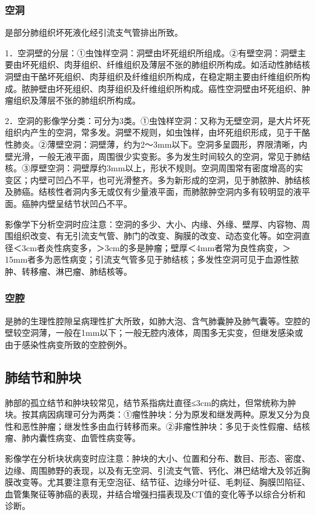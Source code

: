\subsubsection{空洞}

是部分肺组织坏死液化经引流支气管排出所致。

1．空洞壁的分层：①虫蚀样空洞：洞壁由坏死组织所组成。②有壁空洞：洞壁主要由坏死组织、肉芽组织、纤维组织及薄层不张的肺组织所构成。如活动性肺结核洞壁由干酪坏死组织、肉芽组织及纤维组织所构成，在稳定期主要由纤维组织所构成。脓肿壁由坏死组织、肉芽组织及纤维组织所构成。癌性空洞壁由坏死组织、肿瘤组织及薄层不张的肺组织所构成。

2．空洞的影像学分类：可分为3类。①虫蚀样空洞：又称为无壁空洞，是大片坏死组织内产生的空洞，常多发。洞壁不规则，如虫蚀样，由坏死组织形成，见于干酪性肺炎。②薄壁空洞：洞壁薄，约为2～3mm以下。空洞多呈圆形，界限清晰，内壁光滑，一般无液平面，周围很少实变影。多为发生时间较久的空洞，常见于肺结核。③厚壁空洞：洞壁厚约3mm以上，形状不规则。空洞周围常有密度增高的实变区；内壁可凹凸不平，也可光滑整齐。多为新形成的空洞，见于肺脓肿、肺结核及肺癌。结核性者洞内多无或仅有少量液平面，而肺脓肿空洞内多有较明显的液平面。癌肿内壁呈结节状凹凸不平。

影像学下分析空洞时应注意：空洞的多少、大小、内缘、外缘、壁厚、内容物、周围组织改变、有无引流支气管、肺门的改变、胸膜的改变、动态变化等。如空洞直径＜3cm者炎性病变多，＞3cm的多是肿瘤；壁厚＜4mm者常为良性病变，＞15mm者多为恶性病变；引流支气管多见于肺结核；多发性空洞可见于血源性脓肿、转移瘤、淋巴瘤、肺结核等。

\subsubsection{空腔}

是肺的生理性腔隙呈病理性扩大所致，如肺大泡、含气肺囊肿及肺气囊等。空腔的壁较空洞薄，一般在1mm以下；一般无腔内液体，周围多无实变，但继发感染或由于感染性病变所致的空腔例外。

\subsection{肺结节和肿块}

肺部的孤立结节和肿块较常见，结节系指病灶直径≤3cm的病灶，但常统称为肿块。按其病因病理可分为两类：①瘤性肿块：分为原发和继发两种。原发又分为良性和恶性肿瘤；继发性多由血行转移而来。②非瘤性肿块：多见于炎性假瘤、结核瘤、肺内囊性病变、血管性病变等。

影像学在分析块状病变时应注意：肿块的大小、位置和分布、数目、形态、密度、边缘、周围肺野的表现，以及有无空洞、引流支气管、钙化、淋巴结增大及邻近胸膜改变等。尤其要注意有无空泡征、结节征、边缘分叶征、毛刺征、胸膜凹陷征、血管集聚征等肺癌的表现，并结合增强扫描表现及CT值的变化等予以综合分析和诊断。

